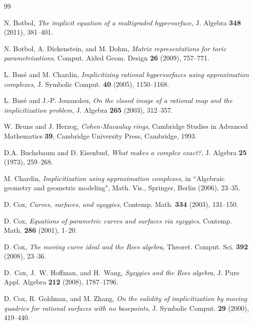 \documentclass[reqno]{amsart}
\numberwithin{equation}{section}
\theoremstyle{definition}
\begin{document}
\begin{thebibliography}{99}




  N. Botbol, 
\textit{The implicit equation of a multigraded hypersurface}, J. Algebra \textbf{348} (2011), 381--401.

 N. Botbol, A. Dickenstein, and M. Dohm,
\textit{Matrix representations for toric parametrizations}, Comput. Aided Geom. Design \textbf{26}  (2009),  757--771.




 L. Bus\'e and M. Chardin,
\textit{Implicitizing rational hypersurfaces using approximation complexes}, J. Symbolic Comput. \textbf{40} (2005), 1150--1168. 




 L. Bus\'e and J.-P. Jouanolou,
\textit{On the closed image of a rational map and the implicitization problem},
J. Algebra \textbf{265} (2003),  312--357. 


 W. Bruns and J. Herzog, \textit{Cohen-Macaulay rings}, Cambridge Studies in Advanced Mathematics \textbf{39}, Cambridge University Press, Cambridge, 1993. 



 D.A. Buchsbaum and D. Eisenbud, \textit{What makes a complex exact?}, J. Algebra \textbf{25} (1973), 259--268.



 M. Chardin, \textit{Implicitization using approximation complexes}, in ``Algebraic geometry and geometric modeling", Math. Vis., Springer, Berlin (2006), 23--35. 
 


 D. Cox, \textit{Curves, surfaces, and syzygies},   Contemp. Math. \textbf{334} (2003), 131--150. 


 D. Cox, \textit{Equations of parametric curves and surfaces via syzygies},   Contemp. Math. \textbf{286} (2001), 1--20. 


 D. Cox, \textit{The moving curve ideal and the Rees algebra},  Theoret. Comput. Sci. \textbf{392} (2008), 23--36. 

D.~Cox, J.~W. Hoffman, and H.~Wang, \textit{Syzygies and the Rees algebra}, J. Pure Appl. Algebra \textbf{212} (2008), 1787--1796.

 D. Cox, R. Goldman, and M. Zhang, \textit{On the validity of implicitization by moving quadrics for rational surfaces with no basepoints}, J. Symbolic Comput. \textbf{29} (2000), 419--440.



\end{thebibliography}
\end{document}
